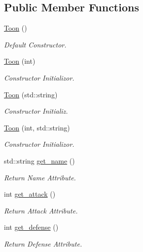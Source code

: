\subsection*{Public Member Functions}
\begin{DoxyCompactItemize}
\item 
\mbox{\label{classToon_a451c96fb183563a81669fd953352ed67}} 
\mbox{\hyperlink{classToon_a451c96fb183563a81669fd953352ed67}{Toon}} ()
\begin{DoxyCompactList}\small\item\em Default Constructor. \end{DoxyCompactList}\item 
\mbox{\hyperlink{classToon_aed3a18077d6183f653916b241ffda895}{Toon}} (int)
\begin{DoxyCompactList}\small\item\em Constructor Initializor. \end{DoxyCompactList}\item 
\mbox{\hyperlink{classToon_aeab02877d7d267c2d6ca88dfa06b837f}{Toon}} (std\+::string)
\begin{DoxyCompactList}\small\item\em Constructor Initializ. \end{DoxyCompactList}\item 
\mbox{\hyperlink{classToon_a665c51a1337f1ed9981d43d8700d4278}{Toon}} (int, std\+::string)
\begin{DoxyCompactList}\small\item\em Constructor Initializor. \end{DoxyCompactList}\item 
std\+::string \mbox{\hyperlink{classToon_ad06e0d8f848b3ea7f132a5c540c6fe00}{get\+\_\+name}} ()
\begin{DoxyCompactList}\small\item\em Return Name Attribute. \end{DoxyCompactList}\item 
int \mbox{\hyperlink{classToon_ac21e716a937e5ae75015cb7616238970}{get\+\_\+attack}} ()
\begin{DoxyCompactList}\small\item\em Return Attack Attribute. \end{DoxyCompactList}\item 
int \mbox{\hyperlink{classToon_ad26a68a1fc3e680ed92bfde0266fbe94}{get\+\_\+defense}} ()
\begin{DoxyCompactList}\small\item\em Return Defense Attribute. \end{DoxyCompactList}\item 

\end{DoxyCompactItemize}
